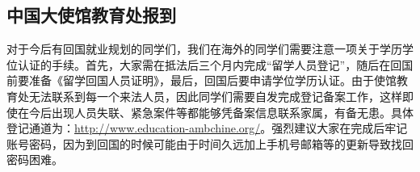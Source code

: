 \subsection{中国大使馆教育处报到}

对于今后有回国就业规划的同学们，我们在海外的同学们需要注意一项关于学历学位认证的手续。首先，大家需在抵法后三个月内完成“留学人员登记”，随后在回国前要准备《留学回国人员证明》，最后，回国后要申请学位学历认证。由于使馆教育处无法联系到每一个来法人员，因此同学们需要自发完成登记备案工作，这样即使在今后出现人员失联、紧急案件等都能够凭备案信息联系家属，有备无患。具体登记通道为：\href{http://www.education-ambchine.org/}{http://www.education-ambchine.org/}。强烈建议大家在完成后牢记账号密码，因为到回国的时候可能由于时间久远加上手机号邮箱等的更新导致找回密码困难。
